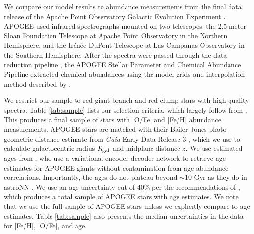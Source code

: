 \documentclass[twocolumn,twocolappendix,linenumbers,trackchanges]{aastex631}
\begin{document}

We compare our model results to abundance measurements from the final data release \citep[DR17;][]{Abdurro'uf2022-SDSSIV-DR17} of the Apache Point Observatory Galactic Evolution Experiment \citep[APOGEE;][]{Majewski2017-APOGEE}. APOGEE used infrared spectrographs \citep{Wilson2019-APOGEE-Spectrographs} mounted on two telescopes: the 2.5-meter Sloan Foundation Telescope \citep{Gunn2006-SloanTelescope} at Apache Point Observatory in the Northern Hemisphere, and the Ir{\'e}n{\'e}e DuPont Telescope \citep{BowenVaughan1973-DuPontTelescope} at Las Campanas Observatory in the Southern Hemisphere. After the spectra were passed through the data reduction pipeline \citep{Nidever2015-APOGEE-DataReduction}, the APOGEE Stellar Parameter and Chemical Abundance Pipeline \citep[ASPCAP;][]{Holtzmann2015-ASPCAP,GarciaPerez2016-ASPCAP} extracted chemical abundances using the model grids and interpolation method described by \citet{Jonsson2020-APOGEE-DR16}.

We restrict our sample to red giant branch and red clump stars with high-quality spectra. Table \ref{tab:sample} lists our selection criteria, which largely follow from \citet{Hayden2015-ChemicalCartography}. This produces a final sample of stars with [O/Fe] and [Fe/H] abundance measurements. APOGEE stars are matched with their Bailer-Jones photo-geometric distance estimate from \textit{Gaia} Early Data Release 3 \citep{Gaia2016-Mission,Gaia2021-EDR3}, which we use to calculate galactocentric radius $R_{\rm gal}$ and midplane distance $z$.
We use estimated ages from \citet[][hereafter ]{Leung2023-Ages}, who use a variational encoder-decoder network to retrieve age estimates for APOGEE giants without contamination from age-abundance correlations. Importantly, the  ages do not plateau beyond $\sim10$ Gyr as they do in astroNN \citep{Mackereth2019-astroNN-Ages}. We use an age uncertainty cut of 40\% per the recommendations of , which produces a total sample of APOGEE stars with age estimates. We note that we use the full sample of APOGEE stars unless we explicitly compare to age estimates. Table \ref{tab:sample} also presents the median uncertainties in the data for [Fe/H], [O/Fe], and age.
\end{document}
